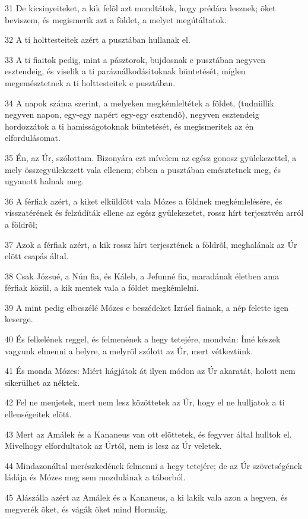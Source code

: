 \par 31 De kicsinyeiteket, a kik felõl azt mondtátok, hogy prédára lesznek; õket beviszem, és megismerik azt a földet, a melyet megútáltatok.
\par 32 A ti holttesteitek azért a pusztában hullanak el.
\par 33 A ti fiaitok pedig, mint a pásztorok, bujdosnak e pusztában negyven esztendeig, és viselik a ti paráználkodásitoknak büntetését, míglen megemésztetnek a ti holttesteitek e pusztában.
\par 34 A napok száma szerint, a melyeken megkémleltétek a földet, (tudniillik negyven napon, egy-egy napért egy-egy esztendõ), negyven esztendeig hordozzátok a ti hamisságotoknak büntetését, és megismeritek az én elfordulásomat.
\par 35 Én, az Úr, szólottam. Bizonyára ezt mívelem az egész gonosz gyülekezettel, a mely összegyülekezett vala ellenem; ebben a pusztában emésztetnek meg, és ugyanott halnak meg.
\par 36 A férfiak azért, a kiket elküldött vala Mózes a földnek megkémlelésére, és visszatérének és felzúdíták ellene az egész gyülekezetet, rossz hírt terjesztvén arról a földrõl;
\par 37 Azok a férfiak azért, a kik rossz hírt terjesztének a földrõl, meghalának az Úr elõtt csapás által.
\par 38 Csak Józsué, a Nún fia, és Káleb, a Jefunné fia, maradának életben ama férfiak közül, a kik mentek vala a földet megkémlelni.
\par 39 A mint pedig elbeszélé Mózes e beszédeket Izráel fiainak, a nép felette igen keserge.
\par 40 És felkelének reggel, és felmenének a hegy tetejére, mondván: Ímé készek vagyunk elmenni a helyre, a melyrõl szólott az Úr, mert vétkeztünk.
\par 41 És monda Mózes: Miért hágjátok át ilyen módon az Úr akaratát, holott nem sikerülhet az néktek.
\par 42 Fel ne menjetek, mert nem lesz közöttetek az Úr, hogy el ne hulljatok a ti ellenségeitek elõtt.
\par 43 Mert az Amálek és a Kananeus van ott elõttetek, és fegyver által hulltok el. Mivelhogy elfordultatok az Úrtól, nem is lesz az Úr veletek.
\par 44 Mindazonáltal merészkedének felmenni a hegy tetejére; de az Úr szövetségének ládája és Mózes meg sem mozdulának a táborból.
\par 45 Alászálla azért az Amálek és a Kananeus, a ki lakik vala azon a hegyen, és megverék õket, és vágák õket mind Hormáig.

